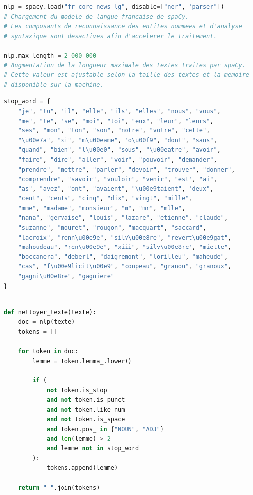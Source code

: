 \begin{lstlisting}[language=Python, caption={Importation du modèle français de spaCy}]
nlp = spacy.load("fr_core_news_lg", disable=["ner", "parser"])
# Chargement du modele de langue francaise de spaCy.
# Les composants de reconnaissance des entites nommees et d'analyse
# syntaxique sont desactives afin d'accelerer le traitement.

nlp.max_length = 2_000_000
# Augmentation de la longueur maximale des textes traites par spaCy.
# Cette valeur est ajustable selon la taille des textes et la memoire
# disponible sur la machine.
\end{lstlisting}
\newpage
\begin{lstlisting}[language=Python, caption={Liste de stop words personnalisée}]
stop_word = {
    "je", "tu", "il", "elle", "ils", "elles", "nous", "vous",
    "me", "te", "se", "moi", "toi", "eux", "leur", "leurs",
    "ses", "mon", "ton", "son", "notre", "votre", "cette",
    "\u00e7a", "si", "m\u00eame", "o\u00f9", "dont", "sans",
    "quand", "bien", "l\u00e0", "sous", "\u00eatre", "avoir",
    "faire", "dire", "aller", "voir", "pouvoir", "demander",
    "prendre", "mettre", "parler", "devoir", "trouver", "donner",
    "comprendre", "savoir", "vouloir", "venir", "est", "ai",
    "as", "avez", "ont", "avaient", "\u00e9taient", "deux",
    "cent", "cents", "cinq", "dix", "vingt", "mille",
    "mme", "madame", "monsieur", "m", "mr", "mlle",
    "nana", "gervaise", "louis", "lazare", "etienne", "claude",
    "suzanne", "mouret", "rougon", "macquart", "saccard",
    "lacroix", "renn\u00e9e", "silv\u00e8re", "revert\u00e9gat",
    "mahoudeau", "ren\u00e9e", "xiii", "silv\u00e8re", "miette",
    "boccanera", "deberl", "daigremont", "lorilleu", "maheude",
    "cas", "f\u00e9licit\u00e9", "coupeau", "granou", "granoux",
    "gagni\u00e8re", "gagniere"
}
\end{lstlisting}
    

\begin{lstlisting}[language=Python, caption={Fonction de lemmatisation avec exclusion de mots spécifiques}]

def nettoyer_texte(texte):
    doc = nlp(texte)
    tokens = []

    for token in doc:
        lemme = token.lemma_.lower()

        if (
            not token.is_stop
            and not token.is_punct
            and not token.like_num
            and not token.is_space
            and token.pos_ in {"NOUN", "ADJ"}
            and len(lemme) > 2
            and lemme not in stop_word
        ):
            tokens.append(lemme)

    return " ".join(tokens)
\end{lstlisting}

